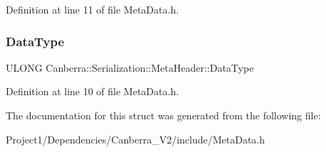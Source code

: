 Definition at line 11 of file Meta\+Data.\+h.

\mbox{\label{struct_canberra_1_1_serialization_1_1_meta_header_a5acce9362261fedafd7f48b6943dc1ef}} 
\subsubsection{\texorpdfstring{Data\+Type}{DataType}}
{\footnotesize\ttfamily U\+L\+O\+NG Canberra\+::\+Serialization\+::\+Meta\+Header\+::\+Data\+Type}



Definition at line 10 of file Meta\+Data.\+h.



The documentation for this struct was generated from the following file\+:\begin{DoxyCompactItemize}
\item 
Project1/\+Dependencies/\+Canberra\+\_\+\+V2/include/Meta\+Data.\+h\end{DoxyCompactItemize}

